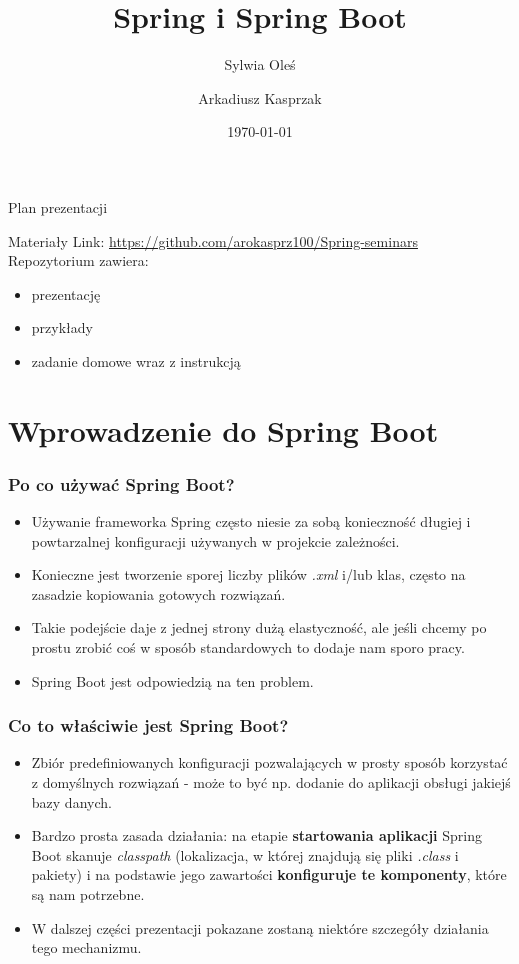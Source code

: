 \documentclass{beamer}
\title{Spring i Spring Boot}
\subtitle{}
\author{Sylwia Oleś \and Arkadiusz Kasprzak}
\institute{}
\date{\today}
\begin{document}
\titleframe[pl]

\begin{frame}{Plan prezentacji}
\tableofcontents
\end{frame}

\begin{frame}{Materiały}
Link: \url{https://github.com/arokasprz100/Spring-seminars} \\
Repozytorium zawiera:
\begin{itemize}
\item prezentację
\item przykłady
\item zadanie domowe wraz z instrukcją
\end{itemize}
\end{frame}

\section{Wprowadzenie do Spring Boot}

\begin{frame}
\frametitle{Po co używać Spring Boot?}
\begin{itemize}
\item Używanie frameworka Spring często niesie za sobą konieczność długiej i powtarzalnej konfiguracji używanych w projekcie zależności.
\item Konieczne jest tworzenie sporej liczby plików \textit{.xml} i/lub klas, często na zasadzie kopiowania gotowych rozwiązań.
\item Takie podejście daje z jednej strony dużą elastyczność, ale jeśli chcemy po prostu zrobić coś w sposób standardowych to dodaje nam sporo pracy.
\item Spring Boot jest odpowiedzią na ten problem.
\end{itemize}
\end{frame}

\begin{frame}
\frametitle{Co to właściwie jest Spring Boot?}
\begin{itemize}
\item Zbiór predefiniowanych konfiguracji pozwalających w prosty sposób korzystać z domyślnych rozwiązań - może to być np. dodanie do aplikacji obsługi jakiejś bazy danych.
\item Bardzo prosta zasada działania: na etapie \textbf{startowania aplikacji} Spring Boot skanuje \textit{classpath} (lokalizacja, w której znajdują się pliki \textit{.class} i pakiety) i na podstawie jego zawartości \textbf{konfiguruje te komponenty}, które są nam potrzebne.
\item W dalszej części prezentacji pokazane zostaną niektóre szczegóły działania tego mechanizmu.
\end{itemize}
\end{frame}
\end{document}
